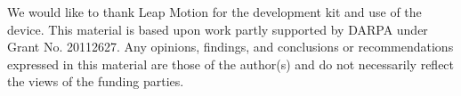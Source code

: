 We would like to thank Leap Motion for the development kit and use of the device. This material is based upon work partly supported by DARPA under Grant No. 20112627. Any opinions, findings, and conclusions or recommendations expressed in this material are those of the author(s) and do not necessarily reflect the views of the funding parties.
